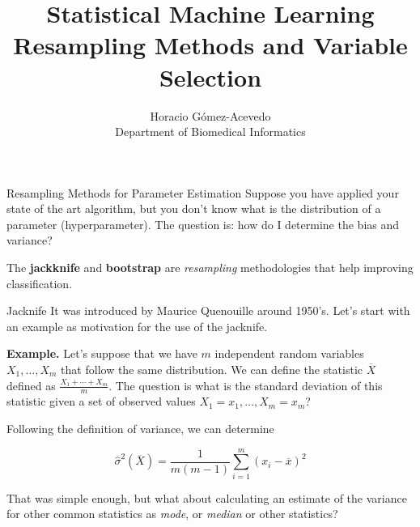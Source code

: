 \documentclass{beamer}
\title{Statistical Machine Learning\\ Resampling Methods and Variable Selection}
\author{Horacio G\'omez-Acevedo\\ Department of Biomedical Informatics}
\begin{document}
	\begin{frame}[plain]
		\maketitle
	\end{frame}


\begin{frame}{Resampling Methods for Parameter Estimation}
	Suppose you have applied your state of the art algorithm, but you don't know what is the distribution of a parameter (hyperparameter). The question is: how do I determine the bias and variance?
	
	The {\bf jackknife} and {\bf bootstrap} are {\it resampling} methodologies that help improving classification.
	
	
	 
\end{frame}

\begin{frame}{Jacknife}
	It was introduced by Maurice Quenouille around 1950's.  Let's start with an example as motivation for the use of the jacknife. 
	
	{\bf Example. } Let's suppose that we have 
	$m$ independent random variables $X_1,\ldots, X_m$ that follow the same distribution. We can define the statistic $\overline{X}$ defined as $\frac{X_1 + \cdots + X_m}{m}$. The question is what is the standard deviation of this statistic given a set of observed values $X_1=x_1,\ldots, X_m=x_m$?
	
	Following the definition of variance, we can determine
	
	\begin{equation}
		\widehat{\sigma}^2(\overline{X})= \frac{1}{m(m-1)} \sum_{i=1}^m (x_i - \overline{x})^2
		\label{eq:stdev}
	\end{equation}
	
	That was simple enough, but what about calculating an estimate of the variance for other common statistics as  {\it mode}, or {\it median} or other statistics?
	
\end{frame}
\end{document}
